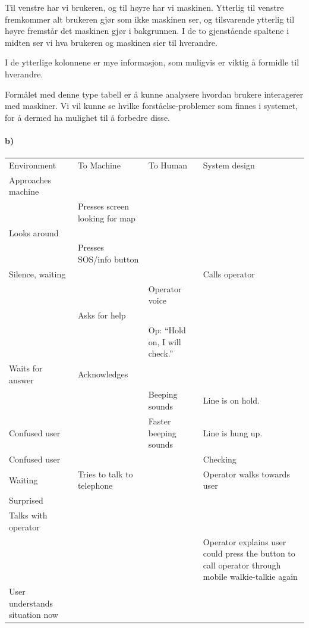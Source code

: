\documentclass{../../myassignment}
\begin{document}
	Til venstre har vi brukeren, og til h{\o}yre har vi maskinen. Ytterlig til venstre fremkommer alt brukeren gj{\o}r som ikke maskinen ser, og tilsvarende ytterlig til h{\o}yre fremst{\aa}r det maskinen gj{\o}r i bakgrunnen. I de to gjenst{\aa}ende spaltene i midten ser vi hva brukeren og maskinen sier til hverandre.

	I de ytterlige kolonnene er mye informasjon, som muligvis er viktig {\aa} formidle til hverandre.

	Form{\aa}let med denne type tabell er \aa{} kunne analysere hvordan brukere interagerer med maskiner. Vi vil kunne se hvilke forst{\aa}else-problemer som finnes i systemet, for {\aa} dermed ha mulighet til {\aa} forbedre disse.

	\newpage

	\paragraph*{b)}  %

	\begin{tabular}{ | >{\centering}p{10em} || >{\raggedleft}p{10em} | >{\raggedright}p{10em} || >{\centering\arraybackslash}p{10em} | }
	\hline
	\multicolumn{2}{|c|}{Human} & \multicolumn{2}{c|}{Machine} \\\hline
	Environment & {To Machine} & To Human & System design\\\hline\hline
	Approaches machine & & & \\\hline
	 & Presses screen looking for map & & \\\hline
	Looks around &  & & \\\hline
	 & Presses SOS/info button &  & \\\hline
	Silence, waiting &  &  & Calls operator \\\hline
	 &  & Operator voice & \\\hline
	 & Asks for help &  & \\\hline
	 &  & Op: ``Hold on, I will check.'' & \\\hline
	Waits for answer & Acknowledges &  & \\\hline
	 &  & Beeping sounds & Line is on hold. \\\hline
	Confused user &  & Faster beeping sounds & Line is hung up. \\\hline
	Confused user &  &  & Checking \\\hline
	Waiting & Tries to talk to telephone &  & Operator walks towards user \\\hline
	Surprised &  &  & \\\hline
	Talks with operator &  &  & \\\hline
	 &  &  & Operator explains user could press the button to call operator through mobile walkie-talkie again \\\hline
	User understands situation now &  &  &  \\\hline

	\end{tabular}
\end{document}
